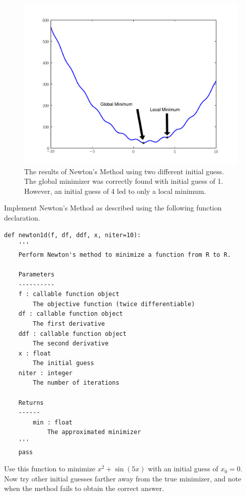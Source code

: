 \begin{figure}
\centering
\includegraphics[width=\textwidth]{newton.pdf}
\caption{The results of Newton's Method using two
different initial guess. The global minimizer was
correctly found with initial guess of 1. However,
an initial guess of 4 led to only a local minimum.}
\label{linesearch:newton}
\end{figure}

\begin{problem}
Implement Newton's Method as described using the following function declaration. 
\begin{lstlisting}
def newton1d(f, df, ddf, x, niter=10):
    '''
    Perform Newton's method to minimize a function from R to R.
    
    Parameters
    ----------
    f : callable function object 
        The objective function (twice differentiable)
    df : callable function object 
        The first derivative
    ddf : callable function object
        The second derivative
    x : float
        The initial guess
    niter : integer
        The number of iterations
        
    Returns
    ------
        min : float
            The approximated minimizer
    '''
    pass
\end{lstlisting}

Use this function to minimize $x^2 + \sin(5x)$ with an initial guess of $x_0 = 0$.
Now try other initial guesses farther away from the true minimizer, and note when the
method fails to obtain the correct answer.
\end{problem}


